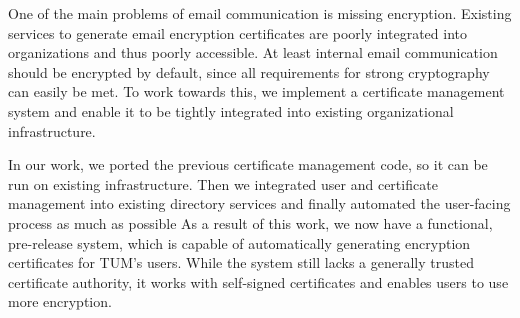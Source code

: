 \small

One of the main problems of email communication is missing encryption.
Existing services to generate email encryption certificates are poorly integrated into organizations and thus poorly
accessible.
At least internal email communication should be encrypted by default, since all requirements for strong cryptography can
easily be met.
To work towards this, we implement a certificate management system and enable it to be tightly integrated into existing
organizational infrastructure.

In our work, we ported the previous certificate management code, so it can be run on existing infrastructure.
Then we integrated user and certificate management into existing directory services and finally automated the
user-facing process as much as possible
As a result of this work, we now have a functional, pre-release system, which is capable of automatically generating
encryption certificates for TUM's users.
While the system still lacks a generally trusted certificate authority, it works with self-signed certificates and
enables users to use more encryption.

